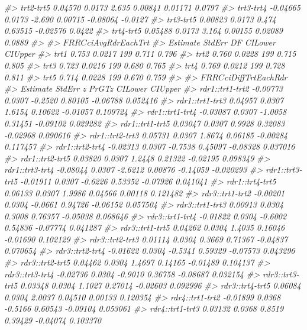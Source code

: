 \documentclass[
]{book}
\newenvironment{Shaded}{\begin{snugshade}}{\end{snugshade}}
\newcommand{\CommentTok}[1]{\textcolor[rgb]{0.56,0.35,0.01}{\textit{#1}}}
\begin{document}
\begin{Shaded}
\begin{Highlighting}[]
\CommentTok{#> trt2-trt5  0.04570 0.0173  2.635 0.00841  0.01171  0.0797}
\CommentTok{#> trt3-trt4 -0.04665 0.0173 -2.690 0.00715 -0.08064 -0.0127}
\CommentTok{#> trt3-trt5  0.00823 0.0173  0.474 0.63515 -0.02576  0.0422}
\CommentTok{#> trt4-trt5  0.05488 0.0173  3.164 0.00155  0.02089  0.0889}
\CommentTok{#> }
\CommentTok{#> $FRRC$ciAvgRdrEachTrt}
\CommentTok{#>      Estimate StdErr  DF CILower CIUpper}
\CommentTok{#> trt1    0.753 0.0217 199   0.711   0.796}
\CommentTok{#> trt2    0.760 0.0228 199   0.715   0.805}
\CommentTok{#> trt3    0.723 0.0216 199   0.680   0.765}
\CommentTok{#> trt4    0.769 0.0212 199   0.728   0.811}
\CommentTok{#> trt5    0.714 0.0228 199   0.670   0.759}
\CommentTok{#> }
\CommentTok{#> $FRRC$ciDiffTrtEachRdr}
\CommentTok{#>                 Estimate StdErr       z   PrGTz  CILower   CIUpper}
\CommentTok{#> rdr1::trt1-trt2 -0.00773 0.0307 -0.2520 0.80105 -0.06788  0.052416}
\CommentTok{#> rdr1::trt1-trt3  0.04957 0.0307  1.6154 0.10622 -0.01057  0.109724}
\CommentTok{#> rdr1::trt1-trt4 -0.03087 0.0307 -1.0058 0.31451 -0.09102  0.029282}
\CommentTok{#> rdr1::trt1-trt5  0.03047 0.0307  0.9928 0.32083 -0.02968  0.090616}
\CommentTok{#> rdr1::trt2-trt3  0.05731 0.0307  1.8674 0.06185 -0.00284  0.117457}
\CommentTok{#> rdr1::trt2-trt4 -0.02313 0.0307 -0.7538 0.45097 -0.08328  0.037016}
\CommentTok{#> rdr1::trt2-trt5  0.03820 0.0307  1.2448 0.21322 -0.02195  0.098349}
\CommentTok{#> rdr1::trt3-trt4 -0.08044 0.0307 -2.6212 0.00876 -0.14059 -0.020293}
\CommentTok{#> rdr1::trt3-trt5 -0.01911 0.0307 -0.6226 0.53352 -0.07926  0.041041}
\CommentTok{#> rdr1::trt4-trt5  0.06133 0.0307  1.9986 0.04566  0.00118  0.121482}
\CommentTok{#> rdr3::trt1-trt2 -0.00201 0.0304 -0.0661 0.94726 -0.06152  0.057504}
\CommentTok{#> rdr3::trt1-trt3  0.00913 0.0304  0.3008 0.76357 -0.05038  0.068646}
\CommentTok{#> rdr3::trt1-trt4 -0.01822 0.0304 -0.6002 0.54836 -0.07774  0.041287}
\CommentTok{#> rdr3::trt1-trt5  0.04262 0.0304  1.4035 0.16046 -0.01690  0.102129}
\CommentTok{#> rdr3::trt2-trt3  0.01114 0.0304  0.3669 0.71367 -0.04837  0.070654}
\CommentTok{#> rdr3::trt2-trt4 -0.01622 0.0304 -0.5341 0.59329 -0.07573  0.043296}
\CommentTok{#> rdr3::trt2-trt5  0.04462 0.0304  1.4697 0.14165 -0.01489  0.104137}
\CommentTok{#> rdr3::trt3-trt4 -0.02736 0.0304 -0.9010 0.36758 -0.08687  0.032154}
\CommentTok{#> rdr3::trt3-trt5  0.03348 0.0304  1.1027 0.27014 -0.02603  0.092996}
\CommentTok{#> rdr3::trt4-trt5  0.06084 0.0304  2.0037 0.04510  0.00133  0.120354}
\CommentTok{#> rdr4::trt1-trt2 -0.01899 0.0368 -0.5166 0.60543 -0.09104  0.053061}
\CommentTok{#> rdr4::trt1-trt3  0.03132 0.0368  0.8519 0.39429 -0.04074  0.103370}

\end{Highlighting}
\end{Shaded}
\end{document}
